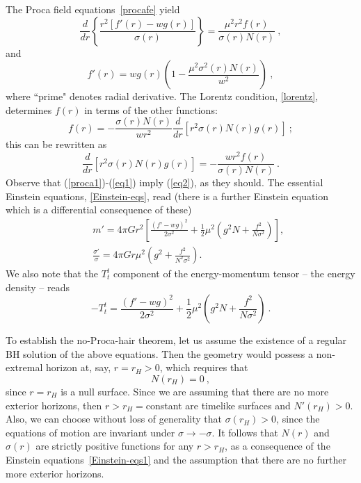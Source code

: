  The Proca field equations~\eqref{procafe} yield 
 \begin{equation}
 \frac{d}{dr}\left\{\frac{r^2[f'(r)-wg(r)]}{\sigma(r)}\right\}=\frac{\mu^2r^2f(r)}{\sigma(r)N(r)} \ ,
 \label{proca1}
 \end{equation}
 and
 \begin{equation}
 f'(r)=wg(r) \left (1-\frac{\mu^2\sigma^2(r)N(r) }{w^2} \right) \ ,
 \label{eq1}
 \end{equation}
 where ``prime" denotes radial derivative. The Lorentz condition, \eqref{lorentz}, determines $f(r)$ in terms of the other functions:
\begin{equation}
f(r)=-\frac{\sigma(r)N(r)}{wr^2}\frac{d}{dr}\left[r^2\sigma(r)N(r)g(r)\right] \ ;
\label{lor}
\end{equation} 
this can be rewritten as
\begin{equation}
\frac{d}{dr}\left[r^2\sigma(r)N(r)g(r)\right] =-\frac{wr^2 f(r)}{\sigma(r)N(r)}\ .
\label{eq2}
\end{equation} 
 Observe that (\ref{proca1})-(\ref{eq1}) imply (\ref{eq2}), as they should. 
%
The essential Einstein equations, \eqref{Einstein-eqs}, read (there is a further Einstein equation which is a differential consequence of these)
\begin{eqnarray}
\label{Einstein-eqs1}
&&
m'=4\pi G r^2
\left[
\frac{(f'-wg)^2}{2\sigma^2}
+\frac{1}{2}\mu^2 \left(g^2N+\frac{f^2}{N\sigma^2}\right)
\right], \nonumber 
\\
&&\frac{\sigma'}{\sigma}=4\pi G r  \mu^2
\left(g^2+\frac{f^2}{N^2\sigma^2} \right).
\end{eqnarray} 
%
We also note that the $T_t^t$ component of the energy-momentum tensor -- the
energy density -- reads
 \begin{equation}
\label{ro}
-T^t_t=
 \frac{(f'-wg)^2}{2\sigma^2}
+\frac{1}{2}\mu^2 \left(g^2N+\frac{f^2}{N\sigma^2} \right)\ .
\end{equation}
 

To establish the no-Proca-hair theorem, let us assume the existence of a regular BH solution of the above  equations. Then the geometry would possess a non-extremal horizon at, say, 
$r=r_H>0$, which requires that 
 \begin{equation}
N(r_H)=0 \ ,
\end{equation}
since $r=r_H$ is a null surface. Since we are assuming that there are no more exterior horizons, then $r>r_H=$constant are timelike surfaces and $N'(r_H)>0$. Also, we can choose without loss of generality that $\sigma(r_H)>0$, since the equations of motion are invariant under $\sigma\rightarrow -\sigma$. It follows that $N(r)$ and $\sigma(r)$ are strictly positive functions for any $r>r_H$, as a consequence of the Einstein equations~\eqref{Einstein-eqs1} and the assumption that there are no further more exterior horizons.

